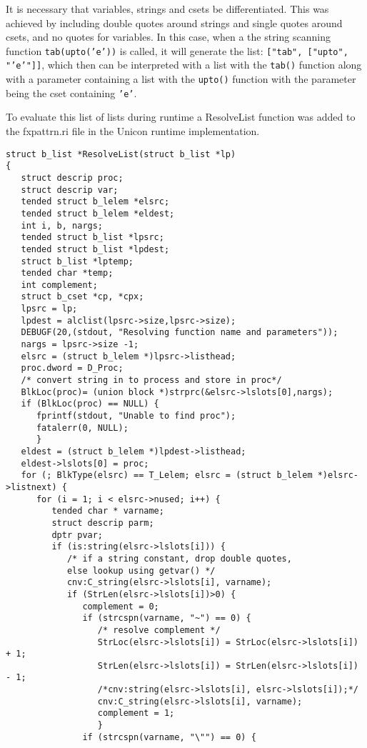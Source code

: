 \documentclass{article}
\begin{document}
It is necessary that variables, strings and csets be differentiated.  This was achieved by including double quotes around strings and single quotes around csets, and no quotes for variables.  In this case, when a the string scanning function \texttt{tab(upto('e'))} is called, it will generate the list: \texttt{["tab", ["upto", "'e'"]]}, which then can be interpreted with a list with the \texttt{tab()} function along with a parameter containing a list with the \texttt{upto()} function with the parameter being the cset containing \texttt{'e'}.

To evaluate this list of lists during runtime a ResolveList function was added to the fxpattrn.ri file in the Unicon runtime implementation.  
\begin{verbatim}
struct b_list *ResolveList(struct b_list *lp)
{
   struct descrip proc;
   struct descrip var;
   tended struct b_lelem *elsrc;
   tended struct b_lelem *eldest;
   int i, b, nargs;
   tended struct b_list *lpsrc;
   tended struct b_list *lpdest;
   struct b_list *lptemp;
   tended char *temp;
   int complement;
   struct b_cset *cp, *cpx;
   lpsrc = lp;
   lpdest = alclist(lpsrc->size,lpsrc->size);
   DEBUGF(20,(stdout, "Resolving function name and parameters"));
   nargs = lpsrc->size -1;
   elsrc = (struct b_lelem *)lpsrc->listhead;
   proc.dword = D_Proc;
   /* convert string in to process and store in proc*/
   BlkLoc(proc)= (union block *)strprc(&elsrc->lslots[0],nargs);
   if (BlkLoc(proc) == NULL) {
      fprintf(stdout, "Unable to find proc");
      fatalerr(0, NULL);
      }
   eldest = (struct b_lelem *)lpdest->listhead;
   eldest->lslots[0] = proc;
   for (; BlkType(elsrc) == T_Lelem; elsrc = (struct b_lelem *)elsrc->listnext) {
      for (i = 1; i < elsrc->nused; i++) {
         tended char * varname;
         struct descrip parm;
         dptr pvar;
         if (is:string(elsrc->lslots[i])) {
            /* if a string constant, drop double quotes,
            else lookup using getvar() */
            cnv:C_string(elsrc->lslots[i], varname);
            if (StrLen(elsrc->lslots[i])>0) {
               complement = 0;
               if (strcspn(varname, "~") == 0) {
                  /* resolve complement */
                  StrLoc(elsrc->lslots[i]) = StrLoc(elsrc->lslots[i]) + 1;
                  StrLen(elsrc->lslots[i]) = StrLen(elsrc->lslots[i]) - 1;
                  /*cnv:string(elsrc->lslots[i], elsrc->lslots[i]);*/
                  cnv:C_string(elsrc->lslots[i], varname);
                  complement = 1;
                  }
               if (strcspn(varname, "\"") == 0) {

\end{verbatim}
\end{document}
